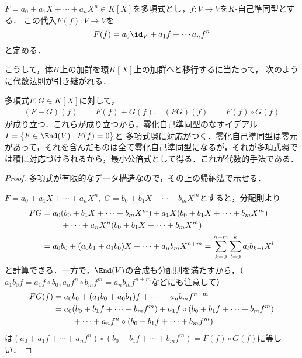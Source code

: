\documentclass[uplatex, dvipdfmx]{jsreport}
\begin{document}
\begin{definition}[多項式への代入]
    $F=a_0+a_1X+\cdots+a_nX^n\in K[X]$を多項式とし，$f:V\to V$を$K$-自己準同型とする．
    この代入$F(f):V\to V$を
    \[ F(f) = a_0\id_V+a_1f+\cdots a_nf^n \]
    と定める．
\end{definition}

こうして，体$K$上の加群を環$K[X]$上の加群へと移行するに当たって，
次のように代数法則が引き継がれる．

\begin{proposition}[functoriality]\label{prop-functoriality-of-substitution}
    多項式$F,G\in K[X]$に対して，
    \begin{align*}
        (F+G)(f)&=F(f)+G(f),&(FG)(f)&=F(f)\circ G(f)
    \end{align*}
    が成り立つ．これらが成り立つから，零化自己準同型のなすイデアル$I=\{F\in\End(V)\mid F(f)=0\}$と
    多項式環に対応がつく．零化自己準同型は零元があって，それを含んだものは全て零化自己準同型になるが，それが多項式環では積に対応づけられるから，最小公倍式として得る．これが代数的手法である．
\end{proposition}
\begin{proof}
    多項式が有限的なデータ構造なので，その上の帰納法で示せる．

    $F=a_0+a_1X+\cdots+a_nX^n,\;G=b_0+b_1X+\cdots+b_mX^m$とすると，分配則より
    \begin{align*}
        FG&=a_0(b_0+b_1X+\cdots+b_mX^m)+a_1X(b_0+b_1X+\cdots+b_mX^m)\\
        &\hphantom{===}+\cdots+a_nX^n(b_0+b_1X+\cdots+b_mX^m)\\
        &=a_0b_0+(a_0b_1+a_1b_0)X+\cdots+a_nb_mX^{n+m}=\sum^{n+m}_{k=0}\sum^k_{l=0}a_lb_{k-l}X^l
    \end{align*}
    と計算できる．一方で，$\End(V)$の合成も分配則を満たすから，（$a_1b_0f=a_1f\circ b_0,a_nf^n\circ b_mf^m=a_nb_mf^{n+m}$などにも注意して）
    \begin{align*}
        FG(f)&=a_0b_0+(a_1b_0+a_0b_1)f+\cdots+a_nb_mf^{n+m}\\
        &=a_0(b_0+b_1f+\cdots+b_mf^m)+a_1f\circ(b_0+b_1f+\cdots+b_mf^m)\\
        &\hphantom{===}+\cdots+a_nf^n\circ(b_0+b_1f+\cdots+b_mf^m)
    \end{align*}
    は$(a_0+a_1f+\cdots+a_nf^n)\circ(b_0+b_1f+\cdots+b_mf^m)=F(f)\circ G(f)$に等しい．
\end{proof}
\end{document}
